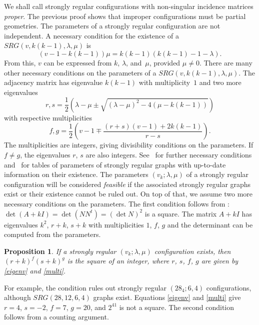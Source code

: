 \documentclass[12pt, reqno]{amsart}
\newtheorem{proposition}[theorem]{Proposition}
\begin{document}
We shall call strongly regular configurations with non-singular incidence matrices \emph{proper}.
The previous proof shows that improper configurations must be partial
geometries. The parameters of a strongly regular configuration are not independent. A
necessary condition for the existence of a $SRG(v,k(k-1),\lambda,\mu)$ is
\begin{equation*}
(v-1-k(k-1))\mu=k(k-1)(k(k-1)-1-\lambda).
\end{equation*}
From this, $v$ can be expressed from $k$, $\lambda$, and~$\mu$, provided $\mu\neq 0$.
There are many other necessary conditions on the parameters
of a $SRG(v,k(k-1),\lambda,\mu)$. The adjacency matrix has eigenvalue $k(k-1)$ with
multiplicity~$1$ and two more eigenvalues
\begin{equation}\label{eigenv}
r,s=\frac{1}{2}\left(\lambda-\mu\pm \sqrt{(\lambda - \mu)^2-4(\mu-k(k-1))} \right)
\end{equation}
with respective multiplicities
\begin{equation}\label{multi}
f,g = \frac{1}{2} \left(v-1\mp \frac{(r+s)(v-1)+2k(k-1)}{r-s}\right).
\end{equation}
The multiplicities are integers, giving divisibility conditions on the para\-meters. If $f\neq g$, the
eigenvalues $r$, $s$ are also integers. See~\cite{BvM21} for further necessary conditions
and~\cite{AEB} for tables of para\-meters of strongly regular graphs with up-to-date
information on their existence. The parameters $(v_k;\lambda,\mu)$ of a strongly regular
configuration will be considered \emph{feasible} if the associated strongly regular graphs
exist or their existence cannot be ruled out. On top of that, we assume two more necessary
conditions on the parameters. The first condition follows from \cite[Theorem 1.2]{BHT97}:
$\det(A+kI)=\det(N N^t)=(\det N)^2$ is a square. The matrix $A+kI$ has
eigenvalues $k^2$, $r+k$, $s+k$ with multiplicities $1$, $f$, $g$ and the determinant can be
computed from the parameters.

\begin{proposition}\label{squarecond}
If a strongly regular $(v_k;\lambda,\mu)$ configuration exists, then $(r+k)^f (s+k)^g$ is the square
of an integer, where $r$, $s$, $f$, $g$ are given by \eqref{eigenv} and \eqref{multi}.
\end{proposition}

For example, the condition rules out strongly regular $(28_4;6,4)$ configurations, although
$SRG(28,12,6,4)$ graphs exist. Equations \eqref{eigenv} and \eqref{multi} give $r=4$, $s=-2$,
$f=7$, $g=20$, and $2^{41}$ is not a square. The second condition follows from a counting argument.
\end{document}
